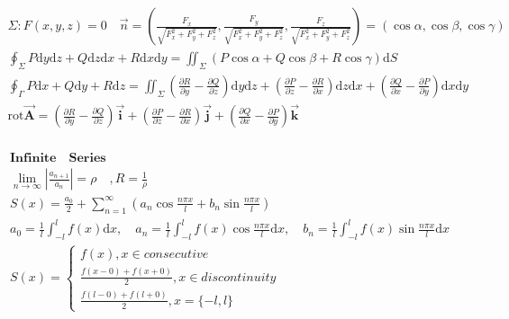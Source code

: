 \documentclass{article}
\begin{document}
\begin{align*}
    \Sigma:F(x,y,z)=0 \quad \vec{n}=\left(\frac{F_{x}}{\sqrt{F_{x}^2+F_{y}^2+F_{z}^2}},\frac{F_{y}}{\sqrt{F_{x}^2+F_{y}^2+F_{z}^2}},\frac{F_{z}}{\sqrt{F_{x}^2+F_{y}^2+F_{z}^2}}\right) = (\cos \alpha,\cos \beta,\cos \gamma)\\
    \oint_{\Sigma}P\mathrm{d}y\mathrm{d}z+Q\mathrm{d}z\mathrm{d}x+R\mathrm{d}x\mathrm{d}y = \iint_{\Sigma}(P\cos \alpha+Q\cos \beta+R\cos \gamma )\mathrm{d}S\\  
    \oint_{\Gamma}P\mathrm{d}x+Q\mathrm{d}y +R\mathrm{d}z = \iint_{\Sigma}\left(\frac{\partial R}{\partial y}-\frac{\partial Q}{\partial z}\right)\mathrm{d}y\mathrm{d}z+\left(\frac{\partial P}{\partial z}-\frac{\partial R}{\partial x}\right)\mathrm{d}z\mathrm{d}x+\left(\frac{\partial Q}{\partial x}-\frac{\partial P}{\partial y}\right)\mathrm{d}x\mathrm{d}y \\
    \bm{\mathrm{rot}\vec{A}} = \left(\frac{\partial R}{\partial y}-\frac{\partial Q}{\partial z}\right)\bm{\vec{i}}+\left(\frac{\partial P}{\partial z}-\frac{\partial R}{\partial x}\right)\bm{\vec{j}}+\left(\frac{\partial Q}{\partial x}-\frac{\partial P}{\partial y}\right)\bm{\vec{k}}\\
\end{align*}

\begin{align*}
    \bm{Infinite \quad Series} \\ 
    \lim_{n \to \infty} |\frac{a_{n+1}}{a_{n}}| = \rho \quad, R = \frac{1}{\rho} \\ 
    S(x) = \frac{a_{0}}{2} + \sum_{n=1}^{\infty}(a_{n}\cos{\frac{n\pi x}{l}} + b_{n}\sin{\frac{n\pi x}{l}}) \\ 
    a_{0} = \frac{1}{l}\int_{-l}^{l}f(x)\mathrm{d}x ,\quad a_{n} = \frac{1}{l}\int_{-l}^{l}f(x)\cos{\frac{n\pi x}{l}}\mathrm{d}x ,\quad b_{n} = \frac{1}{l}\int_{-l}^{l}f(x)\sin{\frac{n\pi x}{l}}\mathrm{d}x \\ 
    S(x) = \left\{ 
    \begin{array}{rl} 
        f(x),x \in consecutive \\ 
        \frac{f(x-0)+f(x+0)}{2},x \in discontinuity \\  
        \frac{f(l-0)+f(l+0)}{2},x = \{-l,l\} 
    \end{array} \right. \ \\ 
\end{align*}

\clearpage
\end{document}
